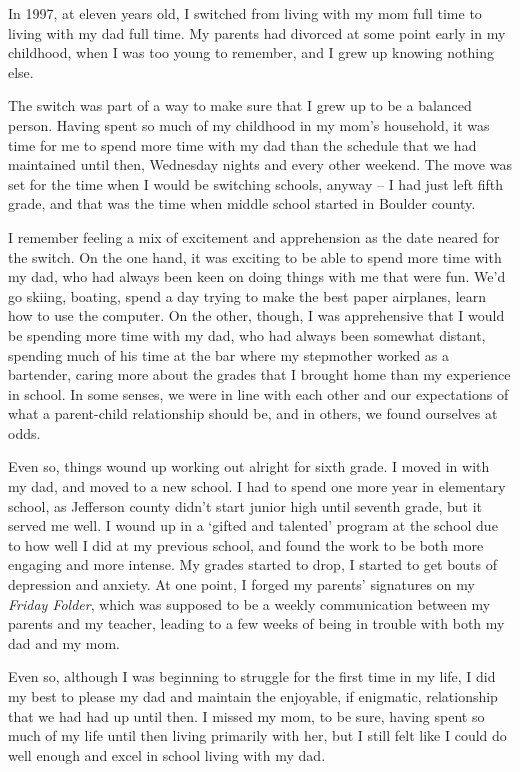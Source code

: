 \begin{paracol}{2}
\begin{leftcolumn}
In 1997, at eleven years old, I switched from living with my mom full time to living with my dad full time. My parents had divorced at some point early in my childhood, when I was too young to remember, and I grew up knowing nothing else.

The switch was part of a way to make sure that I grew up to be a balanced person. Having spent so much of my childhood in my mom's household, it was time for me to spend more time with my dad than the schedule that we had maintained until then, Wednesday nights and every other weekend. The move was set for the time when I would be switching schools, anyway -- I had just left fifth grade, and that was the time when middle school started in Boulder county.

I remember feeling a mix of excitement and apprehension as the date neared for the switch. On the one hand, it was exciting to be able to spend more time with my dad, who had always been keen on doing things with me that were fun. We'd go skiing, boating, spend a day trying to make the best paper airplanes, learn how to use the computer. On the other, though, I was apprehensive that I would be spending more time with my dad, who had always been somewhat distant, spending much of his time at the bar where my stepmother worked as a bartender, caring more about the grades that I brought home than my experience in school. In some senses, we were in line with each other and our expectations of what a parent-child relationship should be, and in others, we found ourselves at odds.

Even so, things wound up working out alright for sixth grade. I moved in with my dad, and moved to a new school. I had to spend one more year in elementary school, as Jefferson county didn't start junior high until seventh grade, but it served me well. I wound up in a `gifted and talented' program at the school due to how well I did at my previous school, and found the work to be both more engaging and more intense. My grades started to drop, I started to get bouts of depression and anxiety. At one point, I forged my parents' signatures on my \emph{Friday Folder}, which was supposed to be a weekly communication between my parents and my teacher, leading to a few weeks of being in trouble with both my dad and my mom.

Even so, although I was beginning to struggle for the first time in my life, I did my best to please my dad and maintain the enjoyable, if enigmatic, relationship that we had had up until then. I missed my mom, to be sure, having spent so much of my life until then living primarily with her, but I still felt like I could do well enough and excel in school living with my dad.


\end{leftcolumn}
\end{paracol}
